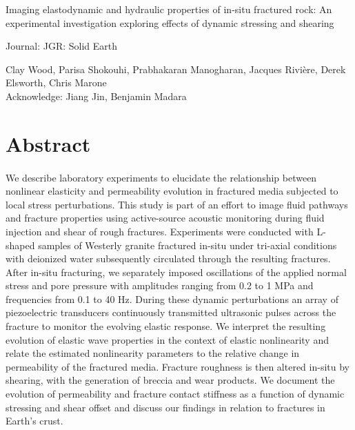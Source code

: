 \documentclass[letterpaper,10pt]{article}
\begin{document}

\doublespacing
\begin{center}
	\huge Imaging elastodynamic and hydraulic properties of in-situ fractured rock: An experimental investigation exploring effects of dynamic stressing and shearing

	\quad

	\large Journal: JGR: Solid Earth

	\quad

	\large Clay Wood, Parisa Shokouhi, Prabhakaran Manogharan, Jacques Rivi\`{e}re, Derek Elsworth, Chris Marone \\
	\large Acknowledge: Jiang Jin, Benjamin Madara

\end{center}
\clearpage





\section{Abstract}
\paragraph{}
We describe laboratory experiments to elucidate the relationship between nonlinear elasticity and permeability evolution in fractured media subjected to local stress perturbations. This study is part of an effort to image fluid pathways and fracture properties using active-source acoustic monitoring during fluid injection and shear of rough fractures. Experiments were conducted with L-shaped samples of Westerly granite fractured in-situ under tri-axial conditions with deionized water subsequently circulated through the resulting fractures. After in-situ fracturing, we separately imposed oscillations of the applied normal stress and pore pressure with amplitudes ranging from 0.2 to 1 MPa and frequencies from 0.1 to 40 Hz. During these dynamic perturbations an array of piezoelectric transducers continuously transmitted ultrasonic pulses across the fracture to monitor the evolving  elastic response. We interpret the resulting evolution of elastic wave properties in the context of elastic nonlinearity and relate the estimated nonlinearity parameters to the relative change in permeability of the fractured media. Fracture roughness is then altered in-situ by shearing, with the generation of breccia and wear products. We document the evolution of permeability and fracture contact stiffness as a function of dynamic stressing and shear offset and discuss our findings in relation to fractures in Earth's crust.
\clearpage
\end{document}

